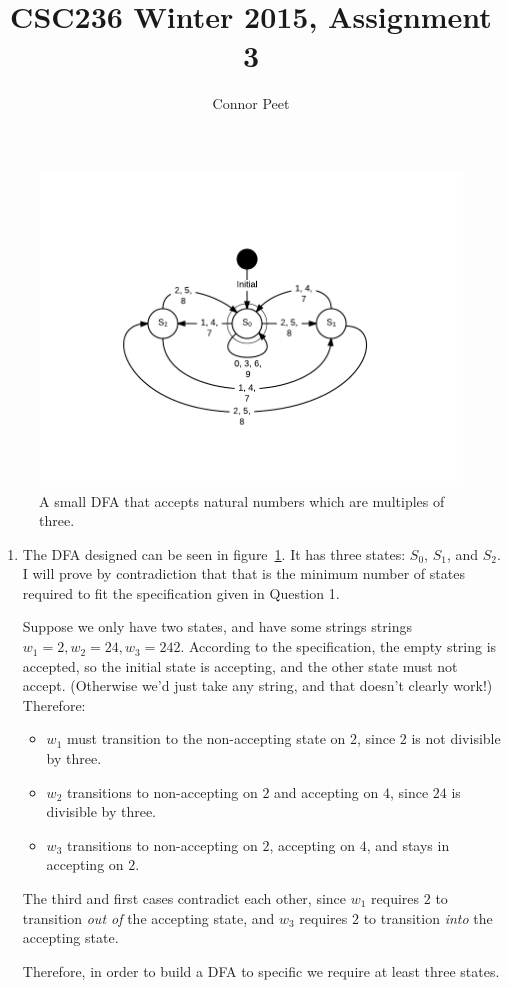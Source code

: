 \documentclass{article}
\title{CSC236 Winter 2015, Assignment 3}
\author{Connor Peet}
\begin{document}
\maketitle

\begin{figure}[p]
    \centering
    \includegraphics[width=\textwidth]{a3q1}
    \caption{A small DFA that accepts natural numbers which are multiples of three.}
    \label{fig:awesome_image}
\end{figure}

\begin{enumerate}

\item
    The DFA designed can be seen in figure~\ref{fig:awesome_image}. It has three states: $S_0$, $S_1$, and $S_2$. I will prove by contradiction that that is the minimum number of states required to fit the specification given in Question 1.

    Suppose we only have two states, and have some strings strings $w_1 = 2, w_2 = 24, w_3 = 242$. According to the specification, the empty string is accepted, so the initial state is accepting, and the other state must not accept. (Otherwise we'd just take any string, and that doesn't clearly work!) Therefore:

        \begin{itemize}
        \item $w_1$ must transition to the non-accepting state on $2$, since $2$ is not divisible by three.
        \item $w_2$ transitions to non-accepting on $2$ and accepting on $4$, since $24$ is divisible by three.
        \item $w_3$ transitions to non-accepting on $2$, accepting on $4$, and stays in accepting on $2$.
        \end{itemize}

    The third and first cases contradict each other, since $w_1$ requires $2$ to transition \textit{out of} the accepting state, and $w_3$ requires $2$ to transition \textit{into} the accepting state.

    Therefore, in order to build a DFA to specific we require at least three states.

\end{enumerate}
\end{document}
